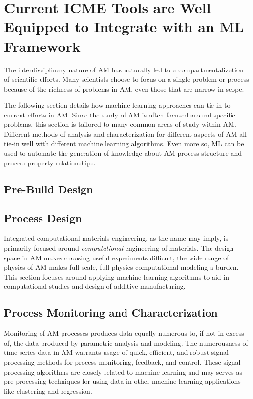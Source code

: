 \section{Current ICME Tools are Well Equipped to Integrate with an ML Framework}
The interdisciplinary nature of AM has naturally led to a compartmentalization of scientific efforts. Many scientists choose to focus on a single problem or process because of the richness of problems in AM, even those that are narrow in scope.  

The following section details how machine learning approaches can tie-in to current efforts in AM. Since the study of AM is often focused around specific problems, this section is tailored to many common areas of study within AM. Different methods of analysis and characterization for different aspects of AM all tie-in well with different machine learning algorithms. Even more so, ML can be used to automate the generation of knowledge about AM process-structure and process-property relationships. 

\subsection{Pre-Build Design}




\subsection{Process Design}
Integrated computational materials engineering, as the name may imply, is primarily focused around \textit{computational} engineering of materials. The design space in AM makes choosing useful experiments difficult; the wide range of physics of AM makes full-scale, full-physics computational modeling a burden. This section focuses around applying machine learning algorithms to aid in computational studies and design of additive manufacturing. 




\subsection{Process Monitoring and Characterization}
Monitoring of AM processes produces data equally numerous to, if not in excess of, the data produced by parametric analysis and modeling. The numerousness of time series data in AM warrants usage of quick, efficient, and robust signal processing methods for process monitoring, feedback, and control. These signal processing algorithms are closely related to machine learning and may serves as pre-processing techniques for using data in other machine learning applications like clustering and regression. 

